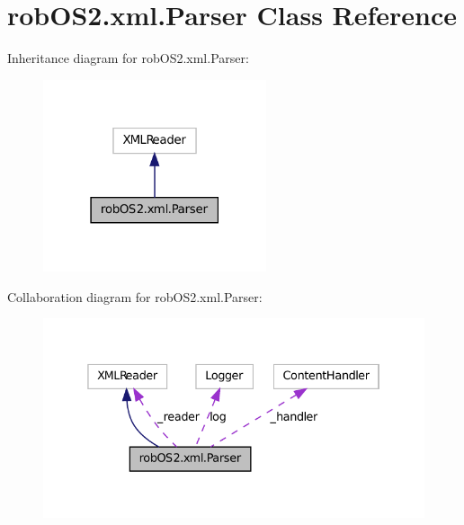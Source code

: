 \hypertarget{classrob_o_s2_1_1xml_1_1_parser}{
\section{robOS2.xml.Parser Class Reference}
\label{classrob_o_s2_1_1xml_1_1_parser}
}


Inheritance diagram for robOS2.xml.Parser:\nopagebreak
\begin{figure}[H]
\begin{center}
\leavevmode
\includegraphics[width=186pt]{classrob_o_s2_1_1xml_1_1_parser__inherit__graph}
\end{center}
\end{figure}


Collaboration diagram for robOS2.xml.Parser:\nopagebreak
\begin{figure}[H]
\begin{center}
\leavevmode
\includegraphics[width=334pt]{classrob_o_s2_1_1xml_1_1_parser__coll__graph}
\end{center}
\end{figure}
